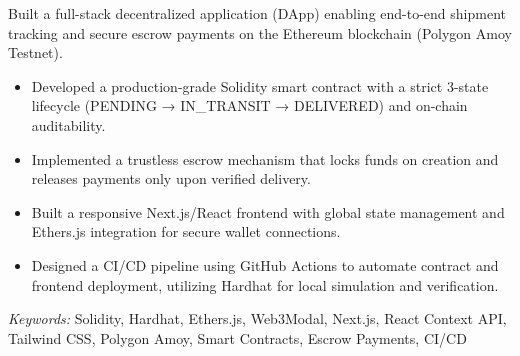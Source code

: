 \nointent {}
 
\nointent Built a full-stack decentralized application (DApp) enabling end-to-end shipment tracking and secure escrow payments on the Ethereum blockchain (Polygon Amoy Testnet). 
 
\begin{itemize} 
    \item Developed a production-grade Solidity smart contract with a strict 3-state lifecycle (PENDING → IN\_TRANSIT → DELIVERED) and on-chain auditability. 
    \item Implemented a trustless escrow mechanism that locks funds on creation and releases payments only upon verified delivery. 
    \item Built a responsive Next.js/React frontend with global state management and Ethers.js integration for secure wallet connections. 
    \item Designed a CI/CD pipeline using GitHub Actions to automate contract and frontend deployment, utilizing Hardhat for local simulation and verification. 
\end{itemize} 
 
\nointent \textit{Keywords:} Solidity, Hardhat, Ethers.js, Web3Modal, Next.js, React Context API, Tailwind CSS, Polygon Amoy, Smart Contracts, Escrow Payments, CI/CD 
